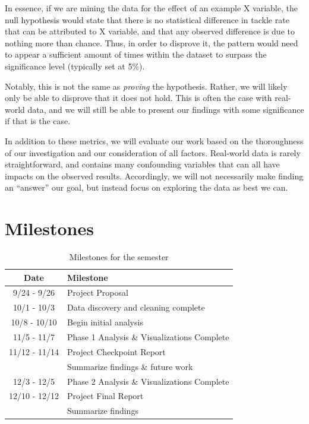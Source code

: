 \documentclass[bibtex, sigconf, hyperref={colorlinks=true,linkcolor=blue,urlcolor=blue}]{acmart}
\begin{document}
In essence, if we are mining the data for the effect of an example X variable, the null
hypothesis would state that there is no statistical difference in tackle rate that can be
attributed to X variable, and that any observed difference is due to nothing more than chance.
Thus, in order to disprove it, the pattern would need to appear a sufficient amount of times
within the dataset to surpass the significance level (typically set at 5\%).

Notably, this is not the same as \textit{proving} the hypothesis. Rather, we will likely
only be able to disprove that it does not hold. This is often the case with real-world data,
and we will still be able to present our findings with some significance if that is the case.

In addition to these metrics, we will evaluate our work based on the thoroughness of our
investigation and our consideration of all factors. Real-world data is rarely straightforward,
and contains many confounding variables that can all have impacts on the observed results.
Accordingly, we will not necessarily make finding an “answer” our goal, but instead focus on
exploring the data as best we can.

\section{Milestones}
\begin{table}[H]
  \caption{Milestones for the semester}
  \label{tab:freq}
  \begin{tabular}{c|l}
    \toprule
    Date & Milestone \\
    \midrule
    9/24 - 9/26   & Project Proposal \\
    10/1 - 10/3   & Data discovery and cleaning complete \\
    10/8 - 10/10  & Begin initial analysis \\
    11/5 - 11/7   & Phase 1 Analysis \& Visualizations Complete \\
    11/12 - 11/14 & Project Checkpoint Report \\
                  & Summarize findings \& future work \\
    12/3 - 12/5   & Phase 2 Analysis \& Visualizations Complete \\
    12/10 - 12/12 & Project Final Report \\
                  & Summarize findings \\
    \bottomrule
  \end{tabular}
\end{table}



\nocite{*}
\end{document}
